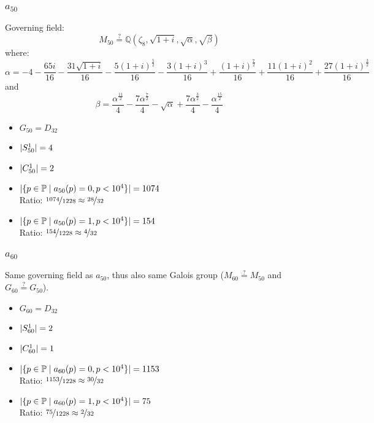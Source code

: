 \subsubsection{$a_{50}$}
Governing field:
$$M_{50} \stackrel{?}{=} \mathbb{Q}\left(\zeta_8, \sqrt{1+i}, \sqrt{\alpha}, \sqrt{\beta}\right)$$
where:
$$\alpha = -4 - \frac{65 i}{16} - \frac{31 \sqrt{1 + i}}{16} - \frac{5 \left(1 + i\right)^{\frac{5}{2}}}{16} - \frac{3 \left(1 + i\right)^{3}}{16} + \frac{\left(1 + i\right)^{\frac{7}{2}}}{16} + \frac{11 \left(1 + i\right)^{2}}{16} + \frac{27 \left(1 + i\right)^{\frac{3}{2}}}{16}$$
and 
$$\beta = \frac{\alpha^{\frac{11}{2}}}{4} - \frac{7 \alpha^{\frac{7}{2}}}{4} - \sqrt{\alpha} + \frac{7 \alpha^{\frac{3}{2}}}{4} - \frac{\alpha^{\frac{15}{2}}}{4}$$
\begin{multicols}{2}
	\begin{itemize}
		\item $G_{50} = D_{32}$
		\item $| S_{50}^1 | = 4$
		\item $| C_{50}^1 | = 2$
	\end{itemize}
	\begin{itemize}
		\item $| \{ p \in \mathbb{P} \mid a_{50}(p)=0, p<10^4 \} | = 1074$\\
		Ratio: $\nicefrac{ 1074 }{ 1228 } \approx \nicefrac{ 28 }{ 32 }$
		\item $| \{ p \in \mathbb{P} \mid a_{50}(p)=1, p<10^4 \} | = 154$\\
		Ratio: $\nicefrac{ 154 }{ 1228 } \approx \nicefrac{ 4 }{ 32 }$
	\end{itemize}
\end{multicols}

\subsubsection{$a_{60}$}
Same governing field as $a_{50}$, thus also same Galois group ($M_{60} \stackrel{?}{=} M_{50}$ and $G_{60} \stackrel{?}{=} G_{50}$).
\begin{multicols}{2}
	\begin{itemize}
		\item $G_{60} = D_{32}$
		\item $| S_{60}^1 | = 2$
		\item $| C_{60}^1 | = 1$
	\end{itemize}
	\begin{itemize}
		\item $| \{ p \in \mathbb{P} \mid a_{60}(p)=0, p<10^4 \} | = 1153$\\
		Ratio: $\nicefrac{ 1153 }{ 1228 } \approx \nicefrac{ 30 }{ 32 }$
		\item $| \{ p \in \mathbb{P} \mid a_{60}(p)=1, p<10^4 \} | = 75$\\
		Ratio: $\nicefrac{ 75 }{ 1228 } \approx \nicefrac{ 2 }{ 32 }$
	\end{itemize}
\end{multicols}

